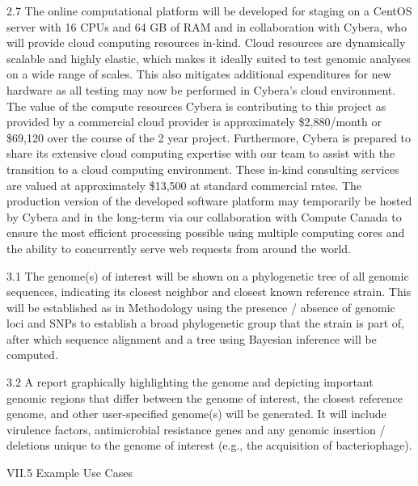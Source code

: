 \documentclass[letterpaper,12pt]{report}
\begin{document}
2.7 The online computational platform will be developed for staging on a CentOS server with 16 CPUs and 64 GB of RAM and in collaboration with Cybera, who will provide cloud computing resources in-kind. Cloud resources are dynamically scalable and highly elastic, which makes it ideally suited to test genomic analyses on a wide range of scales. This also mitigates additional expenditures for new hardware as all testing may now be performed in Cybera’s cloud environment. The value of the compute resources Cybera is contributing to this project as provided by a commercial cloud provider is approximately \$2,880/month or \$69,120 over the course of the 2 year project. Furthermore, Cybera is prepared to share its extensive cloud computing expertise with our team to assist with the transition to a cloud computing environment. These in-kind consulting services are valued at approximately \$13,500 at standard commercial rates. The production version of the developed software platform may temporarily be hosted by Cybera and in the long-term via our collaboration with Compute Canada to ensure the most efficient processing possible using multiple computing cores and the ability to concurrently serve web requests from around the world. 

3.1 The genome(s) of interest will be shown on a phylogenetic tree of all genomic sequences, indicating its closest neighbor and closest known reference strain. This will be established as in Methodology using the presence / absence of genomic loci and SNPs to establish a broad phylogenetic group that the strain is part of, after which sequence alignment and a tree using Bayesian inference will be computed. 

3.2 A report graphically highlighting the genome and depicting important genomic regions that differ between the genome of interest, the closest reference genome, and other user-specified genome(s) will be generated. It will include virulence factors, antimicrobial resistance genes and any genomic insertion / deletions unique to the genome of interest (e.g., the acquisition of bacteriophage).
   

VII.5 Example Use Cases
\end{document}
